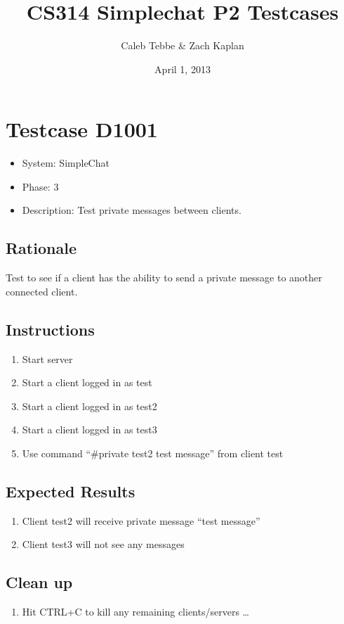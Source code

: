 \documentclass[12pt]{article}
\title{CS314 Simplechat P2 Testcases}
\author{Caleb Tebbe \& Zach Kaplan}
\date{April 1, 2013}
\begin{document}
\maketitle


\section{Testcase D1001}
\begin{itemize}
\item System: SimpleChat
\item Phase: 3
\item Description: Test private messages between clients.
\end{itemize}

\subsection*{Rationale}
Test to see if a client has the ability to send a private message to another connected client.

\subsection*{Instructions}
\begin{enumerate}
\item Start server
\item Start a client logged in as test
\item Start a client logged in as test2
\item Start a client logged in as test3
\item Use command ``\#private test2 test message'' from client test
\end{enumerate}

\subsection*{Expected Results}
\begin{enumerate}
\item Client test2 will receive private message ``test message''
\item Client test3 will not see any messages
\end{enumerate}

\subsection*{Clean up}
\begin{enumerate}
\item Hit CTRL+C to kill any remaining clients/servers \dots
\end{enumerate}
\end{document}

